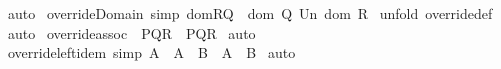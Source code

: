 \begin{isabellebody}
%
\isadelimproof
%
\endisadelimproof
%
\isatagproof
{}\isamarkupfalse%
\ auto\isanewline
{}\isamarkupfalse%
%
\endisatagproof
{\isafoldproof}%
%
\isadelimproof
\isanewline
%
\endisadelimproof
\isanewline
{}\isamarkupfalse%
\ override{\isacharunderscore}Domain\ {\isacharbrackleft}simp{\isacharbrackright}{\isacharcolon}\ {\isachardoublequoteopen}dom{\isacharparenleft}R{\isacharparenleft}{\isacharplus}{\isacharparenright}Q{\isacharparenright}\ {\isacharequal}\ {\isacharparenleft}dom\ {\isacharparenleft}Q{\isacharparenright}{\isacharparenright}\ Un\ {\isacharparenleft}dom\ {\isacharparenleft}R{\isacharparenright}{\isacharparenright}{\isachardoublequoteclose}\isanewline
%
\isadelimproof
%
\endisadelimproof
%
\isatagproof
{}\isamarkupfalse%
\ {\isacharparenleft}unfold\ override{\isacharunderscore}def{\isacharparenright}\isanewline
{}\isamarkupfalse%
\ auto\isanewline
{}\isamarkupfalse%
%
\endisatagproof
{\isafoldproof}%
%
\isadelimproof
\isanewline
%
\endisadelimproof
\isanewline
{}\isamarkupfalse%
\ override{\isacharunderscore}assoc\ {\isacharcolon}\ {\isachardoublequoteopen}{\isacharparenleft}P{\isacharparenleft}{\isacharplus}{\isacharparenright}{\isacharparenleft}Q{\isacharparenleft}{\isacharplus}{\isacharparenright}R{\isacharparenright}{\isacharparenright}\ {\isacharequal}\ {\isacharparenleft}{\isacharparenleft}P{\isacharparenleft}{\isacharplus}{\isacharparenright}Q{\isacharparenright}{\isacharparenleft}{\isacharplus}{\isacharparenright}R{\isacharparenright}{\isachardoublequoteclose}\isanewline
%
\isadelimproof
%
\endisadelimproof
%
\isatagproof
{}\isamarkupfalse%
\ auto\isanewline
{}\isamarkupfalse%
%
\endisatagproof
{\isafoldproof}%
%
\isadelimproof
\isanewline
%
\endisadelimproof
\isanewline
\isanewline
{}\isamarkupfalse%
\ override{\isacharunderscore}left{\isacharunderscore}idem\ {\isacharbrackleft}simp{\isacharbrackright}{\isacharcolon}\ {\isachardoublequoteopen}{\isacharparenleft}A\ {\isacharparenleft}{\isacharplus}{\isacharparenright}\ {\isacharparenleft}A\ {\isacharparenleft}{\isacharplus}{\isacharparenright}\ B{\isacharparenright}{\isacharparenright}\ {\isacharequal}\ {\isacharparenleft}A\ {\isacharparenleft}{\isacharplus}{\isacharparenright}\ B{\isacharparenright}{\isachardoublequoteclose}\isanewline
%
\isadelimproof
%
\endisadelimproof
%
\isatagproof
{}\isamarkupfalse%
\ auto\isanewline
{}\isamarkupfalse%
%
\endisatagproof
{\isafoldproof}%
%
\isadelimproof
\isanewline

\end{isabellebody}
